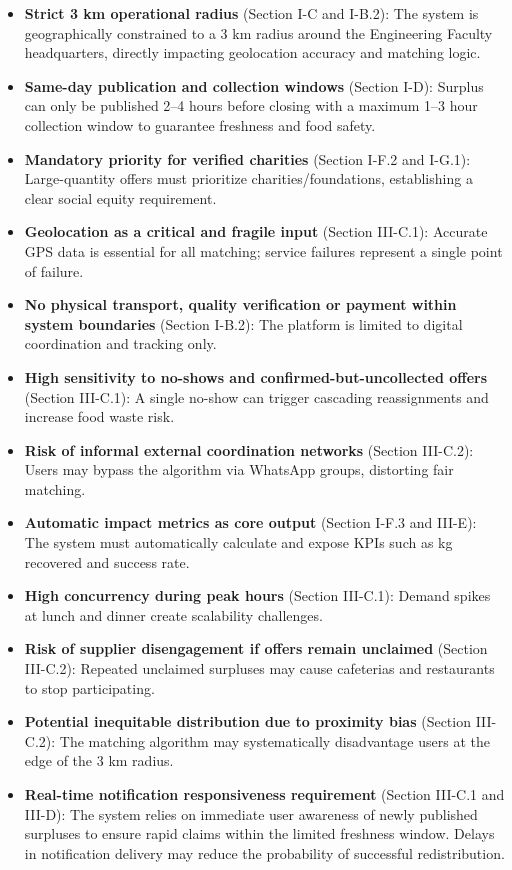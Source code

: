 \documentclass[conference]{IEEEtran}
\begin{document}
\begin{itemize}
    \item \textbf{Strict 3 km operational radius} (Section I-C and I-B.2): The system is geographically constrained to a 3 km radius around the Engineering Faculty headquarters, directly impacting geolocation accuracy and matching logic.
    \item \textbf{Same-day publication and collection windows} (Section I-D): Surplus can only be published 2--4 hours before closing with a maximum 1--3 hour collection window to guarantee freshness and food safety.
    \item \textbf{Mandatory priority for verified charities} (Section I-F.2 and I-G.1): Large-quantity offers must prioritize charities/foundations, establishing a clear social equity requirement.
    \item \textbf{Geolocation as a critical and fragile input} (Section III-C.1): Accurate GPS data is essential for all matching; service failures represent a single point of failure.
    \item \textbf{No physical transport, quality verification or payment within system boundaries} (Section I-B.2): The platform is limited to digital coordination and tracking only.
    \item \textbf{High sensitivity to no-shows and confirmed-but-uncollected offers} (Section III-C.1): A single no-show can trigger cascading reassignments and increase food waste risk.
    \item \textbf{Risk of informal external coordination networks} (Section III-C.2): Users may bypass the algorithm via WhatsApp groups, distorting fair matching.
    \item \textbf{Automatic impact metrics as core output} (Section I-F.3 and III-E): The system must automatically calculate and expose KPIs such as kg recovered and success rate.
    \item \textbf{High concurrency during peak hours} (Section III-C.1): Demand spikes at lunch and dinner create scalability challenges.
    \item \textbf{Risk of supplier disengagement if offers remain unclaimed} (Section III-C.2): Repeated unclaimed surpluses may cause cafeterias and restaurants to stop participating.
    \item \textbf{Potential inequitable distribution due to proximity bias} (Section III-C.2): The matching algorithm may systematically disadvantage users at the edge of the 3 km radius.
    \item \textbf{Real-time notification responsiveness requirement} (Section III-C.1 and III-D): The system relies on immediate user awareness of newly published surpluses to ensure rapid claims within the limited freshness window. Delays in notification delivery may reduce the probability of successful redistribution.
\end{itemize}
\end{document}
